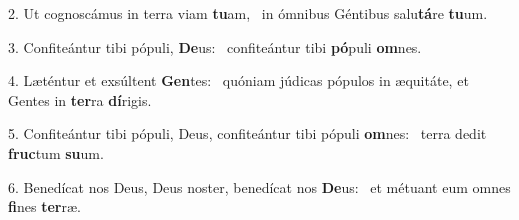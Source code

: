 2. Ut cognoscámus in terra viam \textbf{tu}am, \ast\  in ómnibus Géntibus salu\textbf{tá}re \textbf{tu}um.\

3. Confiteántur tibi pópuli, \textbf{De}us: \ast\  confiteántur tibi \textbf{pó}puli \textbf{om}nes.\

4. Læténtur et exsúltent \textbf{Gen}tes: \ast\  quóniam júdicas pópulos in æquitáte, et Gentes in \textbf{ter}ra \textbf{dí}rigis.\

5. Confiteántur tibi pópuli, Deus, confiteántur tibi pópuli \textbf{om}nes: \ast\  terra dedit \textbf{fruc}tum \textbf{su}um.\

6. Benedícat nos Deus, Deus noster, benedícat nos \textbf{De}us: \ast\  et métuant eum omnes \textbf{fi}nes \textbf{ter}ræ.\

